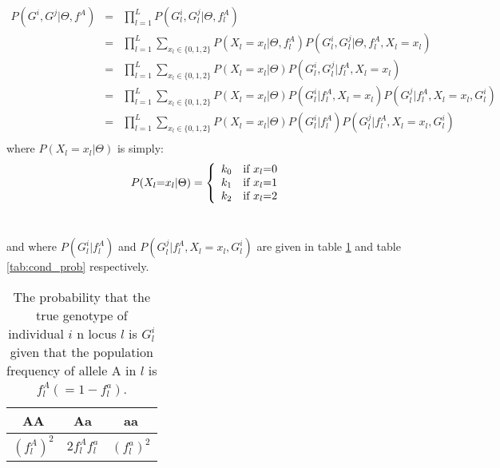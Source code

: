 \documentclass[a4paper, 11pt]{article}
\begin{document}
\footnotesize%
\begin{eqnarray*}%
P(G^{i},G^{j}| \Theta,f^A)&=& \prod_{l=1}^L P(G^{i}_l,G^{j}_l| \Theta,f^A_l)\\
&=&\prod_{l=1}^L \sum_{x_l\in\{0,1,2\}}P(X_l=x_l|\Theta,f^A_l)P(G^{i}_l,G^{j}_l| \Theta,f^A_l,X_l=x_l)\\ 
&=&\prod_{l=1}^L \sum_{x_l\in\{0,1,2\}}P(X_l=x_l|\Theta)P(G^{i}_l,G^{j}_l|f^A_l,X_l=x_l)\\ 
&=&\prod_{l=1}^L \sum_{x_l\in\{0,1,2\}}P(X_l=x_l|\Theta)P(G^{i}_l|f^A_l,X_l=x_l)P(G^{j}_l|f^A_l,X_l=x_l,G^{i}_l)\\ 
&=&\prod_{l=1}^L \sum_{x_l\in\{0,1,2\}}P(X_l=x_l|\Theta)P(G^{i}_l|f^A_l)P(G^{j}_l|f^A_l,X_l=x_l,G^{i}_l)\\ 
\end{eqnarray*}%
\normalsize
where $P(X_l=x_l|\Theta)$ is simply:
\small
\begin{equation}
P(X_{l}\text{=}x_{l}| \Theta)\normalsize= \left\{ \begin{array}{ll}
k_0 & \text{if} \ x_{l} \text{=} 0 \\
k_1 & \text{if} \ x_{l} \text{=} 1 \\
k_2 & \text{if} \ x_{l} \text{=} 2 \\
\end{array} \right.
\label{eq1}
\end{equation}\\%
\normalsize

\noindent
and where $P(G^{i}_l|f^A_l)$ and $P(G^{j}_l|f^A_l,X_l=x_l,G^{i}_l)$ are given in table \ref{tab:prob} and table \ref{tab:cond_prob} respectively.

\begin{table}[h!]
  \centering
  \begin{tabular}{|c|c|c|}
\hline
  AA & Aa & aa\\
\hline
  $(f^A_l)^2$ & $2f^A_lf^a_l$& $(f^a_l)^2$\\
\hline
\end{tabular}
  \caption{The probability that the true genotype of individual $i$ n locus $l$ is $G^{i}_l$given that the population frequency of allele A in $l$ is $f^A_l (=1-f^a_l)$.}
\label{tab:prob}
\end{table}
\end{document}
